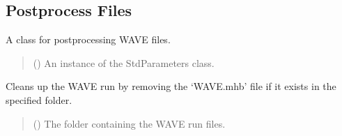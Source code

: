 \documentclass[letterpaper,10pt,english]{sphinxmanual}
\begin{document}
\subsection{Postprocess Files}
\label{\detokenize{API:postprocess-files}}

\begin{fulllineitems}
\label{\detokenize{API:wavepy.postprocess_wave_files.PostprocessWaveFiles}}
\pysigstartsignatures
{}
\pysigstopsignatures
\sphinxAtStartPar
A class for postprocessing WAVE files.
\begin{quote}\begin{description}
\sphinxAtStartPar
{} ({\hyperref[\detokenize{API:wavepy.standard_parameters.StdParameters}]{}}) \textendash{} An instance of the StdParameters class.

\end{description}\end{quote}

\begin{fulllineitems}
\label{\detokenize{API:wavepy.postprocess_wave_files.PostprocessWaveFiles.cleanup}}
\pysigstartsignatures
{}
\pysigstopsignatures
\sphinxAtStartPar
Cleans up the WAVE run by removing the ‘WAVE.mhb’ file if it exists in the specified folder.
\begin{quote}\begin{description}
\sphinxAtStartPar
{} () \textendash{} The folder containing the WAVE run files.


\end{description}
\end{quote}
\end{fulllineitems}
\end{fulllineitems}
\end{document}
